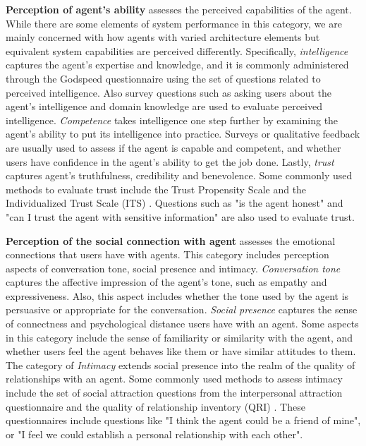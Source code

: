 \documentclass[sigconf,screen,review, anonymous]{acmart}
\newcommand{\cmt}[1]{}%
\begin{document}
\textbf{Perception of agent's ability} assesses the perceived capabilities of the agent. While there are some elements of system performance in this category, we are mainly concerned with how agents with varied architecture elements but equivalent system capabilities are perceived differently. Specifically, \textit{intelligence} captures the agent's expertise and knowledge, and it is commonly administered through the Godspeed questionnaire \cite{bartneck2009measurement}\cmt{godspeed} using the set of questions related to perceived intelligence. Also survey questions such as asking users about the agent's intelligence and domain knowledge are used to evaluate perceived intelligence. \textit{Competence} takes intelligence one step further by examining the agent's ability to put its intelligence into practice. Surveys or qualitative feedback are usually used to assess if the agent is capable and competent, and whether users have confidence in the agent's ability to get the job done. Lastly, \textit{trust} captures agent's truthfulness, credibility and benevolence. Some commonly used methods to evaluate trust include the Trust Propensity Scale \cite{mayer1999effect} and the Individualized Trust Scale (ITS) \cite{wheeless1977measurement}. Questions such as "is the agent honest" and "can I trust the agent with sensitive information" are also used to evaluate trust.

\textbf{Perception of the social connection with agent} assesses the emotional connections that users have with agents. This category includes perception aspects of conversation tone, social presence and intimacy. \textit{Conversation tone} captures the affective impression of the agent's tone, such as empathy and expressiveness. Also, this aspect includes whether the tone used by the agent is persuasive or appropriate for the conversation. \textit{Social presence} captures the sense of connectness and psychological distance users have with an agent. Some aspects in this category include the sense of familiarity or similarity with the agent, and whether users feel the agent behaves like them or have similar attitudes to them. The category of \textit{Intimacy} extends social presence into the realm of the quality of relationships with an agent. Some commonly used methods to assess intimacy include the set of social attraction questions from the interpersonal attraction questionnaire \cite{mccroskey1975development} and the quality of relationship inventory (QRI) \cite{pierce1997assessing}. These questionnaires include questions like "I think the agent could be a friend of mine", or "I feel we could establish a personal relationship with each other".
\end{document}
